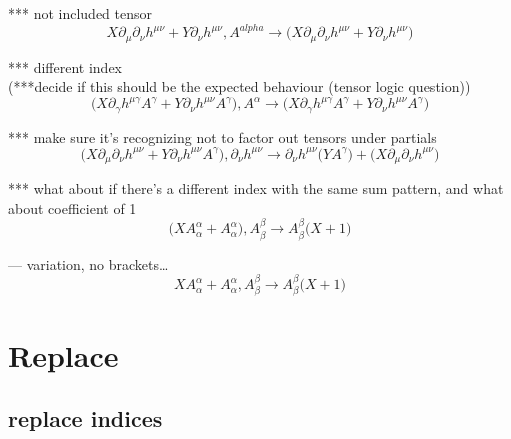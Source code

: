 \documentclass{article}
\def\){\Big)}
\def\({\Big(}
\begin{document}
*** not included tensor\\

\begin{equation}
X \partial_{\mu} \partial_{\nu}h^{\mu \nu} +Y \partial_{\nu}h^{\mu \nu}  , A^{alpha} \rightarrow
\(X \partial_{\mu}\partial_{\nu}h^{\mu \nu} +Y \partial_{\nu}h^{\mu \nu} \)
\end{equation}


*** different index\\

(***decide if this should be the expected behaviour (tensor logic question)) 
\begin{equation}
\(X \partial_{\gamma}h^{\mu \gamma} A^{\gamma} +Y \partial_{\nu}h^{\mu \nu} A^{\gamma} \), A^{\alpha} \rightarrow 
\(X \partial_{\gamma}h^{\mu \gamma} A^{\gamma} +Y \partial_{\nu}h^{\mu \nu} A^{\gamma} \)
\end{equation}

*** make sure it’s recognizing not to factor out tensors under partials\\
\begin{equation}
\(X \partial_{\mu} \partial_{\nu}h^{\mu \nu} +Y \partial_{\nu}h^{\mu \nu} A^{\gamma} \), \partial_{\nu}h^{\mu \nu} \rightarrow
\partial_{\nu}h^{\mu \nu} \(Y A^{\gamma} \)+\(X \partial_{\mu}\partial_{\nu}h^{\mu \nu} \)
\end{equation}

*** what about if there’s a different index with the same sum pattern, and what about coefficient of 1\\
\begin{equation}
\(X A^{\alpha}_{\alpha} + A^{\alpha}_{\alpha}\) , A^{\beta}_{\beta} \rightarrow
A_{\beta}^{\beta} \(X +1 \)
\end{equation}


— variation, no brackets…\\
\begin{equation}
X A^{\alpha}_{\alpha} + A^{\alpha}_{\alpha} , A^{\beta}_{\beta} \rightarrow
A_{\beta}^{\beta} \(X +1 \)
\end{equation}



\section{Replace}


\subsection{replace indices}
\end{document}
